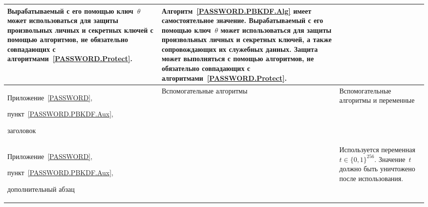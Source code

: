 \begin{center}
\begin{tabular}{|p{3.3cm}|p{6.1cm}|p{6.1cm}|}
Вырабатываемый с его помощью ключ~$\theta$ может использоваться
для защиты произвольных личных и секретных ключей с помощью алгоритмов, не 
обязательно совпадающих с алгоритмами~\ref{PASSWORD.Protect}. 
&
Алгоритм~\ref{PASSWORD.PBKDF.Alg} имеет самостоятельное значение.
Вырабатываемый с его помощью ключ~$\theta$ может использоваться
для защиты произвольных личных и секретных ключей,
а также сопровождающих их служебных данных.
Защита может выполняться с помощью алгоритмов, не обязательно совпадающих 
с алгоритмами~\ref{PASSWORD.Protect}.\\ 
%
\hline
Приложение~\ref{PASSWORD},\par
пункт~\ref{PASSWORD.PBKDF.Aux},\par
заголовок
&
Вспомогательные алгоритмы &
Вспомогательные алгоритмы и переменные\\
\hline
Приложение~\ref{PASSWORD},\par
пункт~\ref{PASSWORD.PBKDF.Aux},\par
дополнительный абзац
&
&
Используется переменная~$t\in\{0,1\}^{256}$. 
Значение~$t$ должно быть уничтожено после использования.\\
\hline
\end{tabular}

\vfill

\mbox{}


\end{center}
